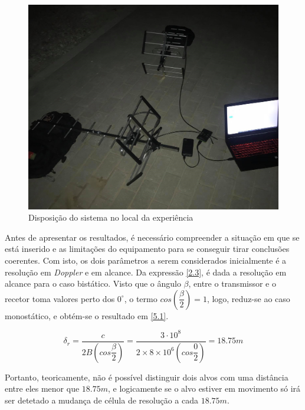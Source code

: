 \begin{figure}[h]
\centering
\includegraphics[scale=0.25]{chapters/ch5/assets/prat2}
\caption[Disposição do sistema]{Disposição do sistema no local da experiência}
\label{fig:prat}
\end{figure}

Antes de apresentar os resultados, é necessário compreender a situação em que se está inserido e as limitações do equipamento para se conseguir tirar conclusões coerentes. Com isto, os dois parâmetros a serem considerados inicialmente é a resolução em \textit{Doppler} e em alcance. Da expressão \ref{2.3}, é dada a resolução em alcance para o caso bistático. Visto que o ângulo $\beta$, entre o transmissor e o recetor toma valores perto dos $0^{\circ}$, o termo $cos\left( \dfrac{\beta}{2}\right) = 1$, logo, reduz-se ao caso monostático, e obtém-se o resultado em \ref{5.1}.

\begin{equation} \label{5.1}
\delta_{r}=\dfrac{c}{2B\left( cos\dfrac{\beta}{2}\right)}=\dfrac{3\cdot 10^{8}}{2\times 8\times 10^{6} \left( cos\dfrac{0}{2}\right)}=18.75 m
\end{equation}

Portanto, teoricamente, não é possível distinguir dois alvos com uma distância entre eles menor que $18.75 m$, e logicamente se o alvo estiver em movimento só irá ser detetado a mudança de célula de resolução a cada $18.75 m$.\par 

